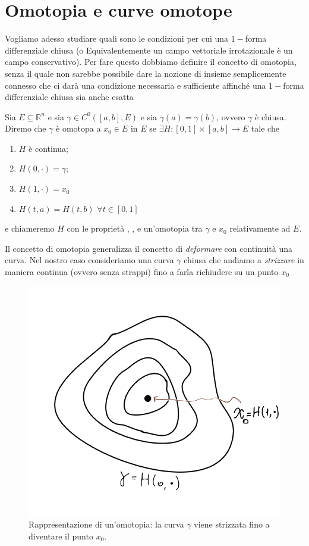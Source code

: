 \section{Omotopia e curve omotope}
Vogliamo adesso studiare quali sono le condizioni per cui una $1-$forma differenziale chiusa (o Equivalentemente un campo vettoriale irrotazionale è un campo conservativo). Per fare questo dobbiamo definire
il concetto di omotopia, senza il quale non sarebbe possibile dare la nozione di insieme semplicemente connesso che ci darà una condizione necessaria e sufficiente affinché una $1-$forma differenziale chiusa sia anche esatta
\begin{definition}[omotopia]
	Sia $E \subseteq \mathbb{R}^n$ e sia $\gamma \in C^0([a, b], E)$ e sia $\gamma(a) = \gamma(b)$, ovvero $\gamma$ è chiusa. Diremo che $\gamma$
	è omotopa a $x_0 \in E$ in $E$ se $\exists H:[0,1] \times [a, b] \to E$ tale che
	\begin{enumerate}[label=\protect\circled{\arabic*}]
		\item $H$ è continua;
		\item $H(0, \cdot) = \gamma$;
		\item $H(1, \cdot) = x_0$
		\item $H(t, a) = H(t, b) \, \, \forall t \in [0, 1]$
	\end{enumerate}
	e chiameremo $H$ con le proprietà , ,  e  un'omotopia tra $\gamma$ e $x_0$ relativamente ad $E$.
\end{definition}
Il concetto di omotopia generalizza il concetto di \emph{deformare} con continuità una curva. Nel nostro caso consideriamo una curva $\gamma$ chiusa che andiamo a \emph{strizzare} in maniera continua (ovvero senza strappi) fino a farla richiudere su un punto $x_0$
\begin{figure}[htbp]
	\centering
	\includegraphics{immagini/omotopia.png}
	\caption{Rappresentazione di un'omotopia: la curva $\gamma$ viene strizzata fino a diventare il punto $x_0$.}
\end{figure}
